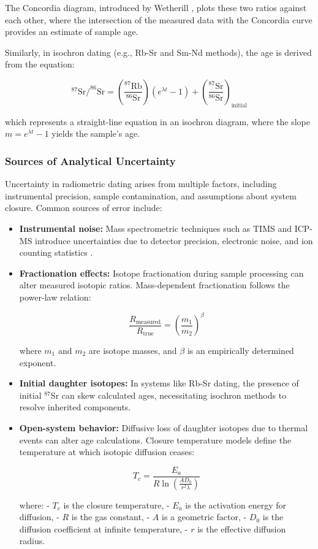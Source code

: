 \documentclass{article}
\begin{document}
The Concordia diagram, introduced by Wetherill \cite{Wetherill1956}, plots these two ratios against each other, where the intersection of the measured data with the Concordia curve provides an estimate of sample age.

Similarly, in isochron dating (e.g., Rb-Sr and Sm-Nd methods), the age is derived from the equation:

\[
^{87}\text{Sr}/^{86}\text{Sr} = \left( \frac{^{87}\text{Rb}}{^{86}\text{Sr}} \right) (e^{\lambda t} - 1) + \left( \frac{^{87}\text{Sr}}{^{86}\text{Sr}} \right)_{\text{initial}}
\]

which represents a straight-line equation in an isochron diagram, where the slope \( m = e^{\lambda t} - 1 \) yields the sample's age.

\subsubsection*{Sources of Analytical Uncertainty}

Uncertainty in radiometric dating arises from multiple factors, including instrumental precision, sample contamination, and assumptions about system closure. Common sources of error include:

\begin{itemize}
    \item \textbf{Instrumental noise:} Mass spectrometric techniques such as TIMS and ICP-MS introduce uncertainties due to detector precision, electronic noise, and ion counting statistics \cite{Rutherford2002}.
    \item \textbf{Fractionation effects:} Isotope fractionation during sample processing can alter measured isotopic ratios. Mass-dependent fractionation follows the power-law relation:

    \[
    \frac{R_{\text{measured}}}{R_{\text{true}}} = \left( \frac{m_1}{m_2} \right)^\beta
    \]

    where \( m_1 \) and \( m_2 \) are isotope masses, and \( \beta \) is an empirically determined exponent.
    \item \textbf{Initial daughter isotopes:} In systems like Rb-Sr dating, the presence of initial \(^{87}\)Sr can skew calculated ages, necessitating isochron methods to resolve inherited components.
    \item \textbf{Open-system behavior:} Diffusive loss of daughter isotopes due to thermal events can alter age calculations. Closure temperature models \cite{Dodson1973} define the temperature at which isotopic diffusion ceases:

    \[
    T_c = \frac{E_a}{R \ln \left( \frac{A D_0}{r^2 \lambda} \right)}
    \]

    where:
    - \( T_c \) is the closure temperature,
    - \( E_a \) is the activation energy for diffusion,
    - \( R \) is the gas constant,
    - \( A \) is a geometric factor,
    - \( D_0 \) is the diffusion coefficient at infinite temperature,
    - \( r \) is the effective diffusion radius.

\end{itemize}
\end{document}
